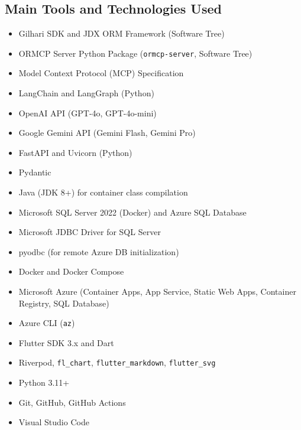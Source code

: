 \documentclass{book}
\begin{document}
\begin{appendices}
\chapter{Main Tools and Technologies Used}
\begin{itemize}
\item Gilhari SDK and JDX ORM Framework (Software Tree)
\item ORMCP Server Python Package (\texttt{ormcp-server}, Software Tree)
\item Model Context Protocol (MCP) Specification
\item LangChain and LangGraph (Python)
\item OpenAI API (GPT-4o, GPT-4o-mini)
\item Google Gemini API (Gemini Flash, Gemini Pro)
\item FastAPI and Uvicorn (Python)
\item Pydantic
\item Java (JDK 8+) for container class compilation
\item Microsoft SQL Server 2022 (Docker) and Azure SQL Database
\item Microsoft JDBC Driver for SQL Server
\item pyodbc (for remote Azure DB initialization)
\item Docker and Docker Compose
\item Microsoft Azure (Container Apps, App Service, Static Web Apps, Container Registry, SQL Database)
\item Azure CLI (\texttt{az})
\item Flutter SDK 3.x and Dart
\item Riverpod, \texttt{fl\_chart}, \texttt{flutter\_markdown}, \texttt{flutter\_svg}
\item Python 3.11+
\item Git, GitHub, GitHub Actions
\item Visual Studio Code
\end{itemize}

\end{appendices}
\end{document}
